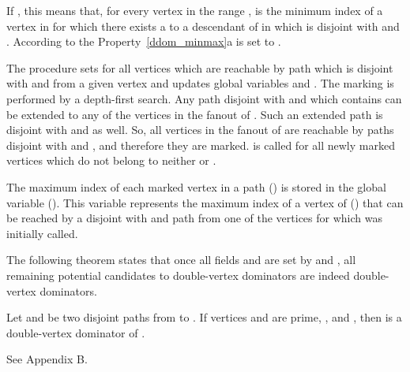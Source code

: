 \documentclass{llncs}
\begin{document}
If , this means that, for every vertex  in
the range ,
 is the minimum index of a vertex in  for which there exists a to a descendant of  in  which is disjoint with  and . According to the Property~\ref{ddom_minmax}a  is set to .

The procedure  sets
 for all vertices  which are reachable by
path which is disjoint with  and  from a given vertex  and updates global variables
 and . The marking 
is performed by a depth-first search. Any
path disjoint with  and  which contains  can be
extended to any of the vertices in the fanout of . Such an extended path 
is disjoint with  and  as well.  So, all vertices in the fanout of  are reachable by  paths disjoint with  and ,
and therefore they are marked.  is called for
all newly marked vertices which do not belong to neither  or .

The maximum index of each marked vertex in a path  () is stored in
the global variable  (). This variable
 represents the maximum index of a vertex of  () that can be reached by 
a disjoint with  and  path from one of the vertices  for which  was
initially called.

The following theorem states that once all  fields  and  are set by
  and
, all remaining potential candidates to
double-vertex dominators are indeed double-vertex dominators.

\begin{theorem} \label{ddom_al02}
Let  and  be two disjoint paths from  to . 
If vertices  and  are prime, ,
and , then  is a double-vertex
dominator of .
\end{theorem}
  See Appendix B.
\end{document}

